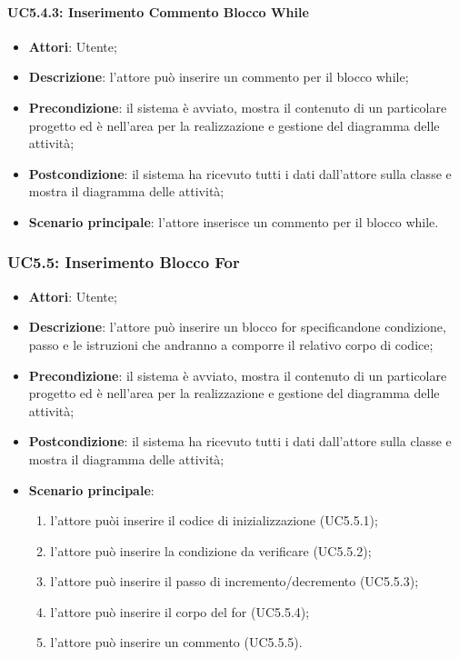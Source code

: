 \paragraph{UC5.4.3: Inserimento Commento Blocco While}
\label{UC5.4.3}
\begin{itemize}
	\item \textbf{Attori}: Utente;
	\item \textbf{Descrizione}: l'attore può inserire un commento per il blocco while;
	\item \textbf{Precondizione}: il sistema è avviato, mostra il contenuto di un particolare progetto ed è nell'area per la realizzazione e gestione del diagramma delle attività;
	\item \textbf{Postcondizione}: il sistema ha ricevuto tutti i dati dall'attore sulla classe e mostra il diagramma delle attività;
	\item \textbf{Scenario principale}: l'attore inserisce un commento per il blocco while.
\end{itemize}

\subsubsection{UC5.5: Inserimento Blocco For}
\label{UC5.5}
\begin{itemize}
	\item \textbf{Attori}: Utente;
	\item \textbf{Descrizione}: l'attore può inserire un blocco for specificandone condizione, passo e le istruzioni che andranno a comporre il relativo corpo di codice;
	\item \textbf{Precondizione}: il sistema è avviato, mostra il contenuto di un particolare progetto ed è nell'area per la realizzazione e gestione del diagramma delle attività;
	\item \textbf{Postcondizione}: il sistema ha ricevuto tutti i dati dall'attore sulla classe e mostra il diagramma delle attività;
	\item \textbf{Scenario principale}:
	\begin{enumerate}
		\item l'attore puòi inserire il codice di inizializzazione (UC5.5.1);
		\item l'attore può inserire la condizione da verificare (UC5.5.2);
		\item l'attore può inserire il passo di incremento/decremento (UC5.5.3);
		\item l'attore può inserire il corpo del for (UC5.5.4);
		\item l'attore può inserire un commento (UC5.5.5).
	\end{enumerate}
\end{itemize}

